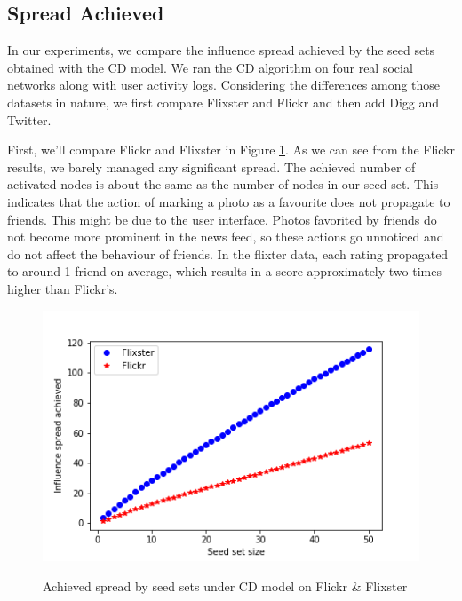 \documentclass{acm_proc_article-sp}
\begin{document}
\subsection*{Spread Achieved}
In our experiments, we compare the influence spread achieved by the seed sets obtained with the CD model. We ran the CD algorithm on four real social networks along with user activity logs. Considering the differences among those datasets in nature, we first compare Flixster and Flickr and then add Digg and Twitter.

First, we'll compare Flickr and Flixster in Figure \ref{spread2}. As we can see from the Flickr results, we barely managed any significant spread. The achieved number of activated nodes is about the same as the number of nodes in our seed set. This indicates that the action of marking a photo as a favourite does not propagate to friends. This might be due to the user interface. Photos favorited by friends do not become more prominent in the news feed, so these actions go unnoticed and do not affect the behaviour of friends. In the flixter data, each rating propagated to around 1 friend on average, which results in a score approximately two times higher than Flickr's.

\begin{figure}[h]
	\includegraphics[width=\linewidth]{spread2.png}
	\centering
	\label{spread2}
	\caption{Achieved spread by seed sets under CD model on Flickr \& Flixster}
\end{figure}
\end{document}
